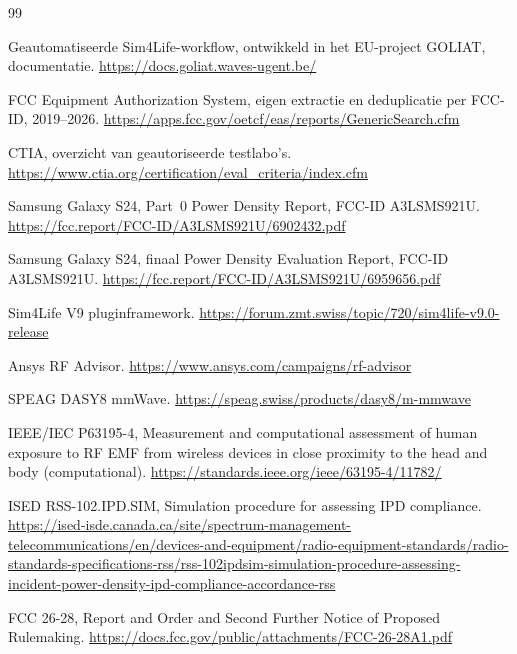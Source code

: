 \documentclass[10pt,a4paper]{article}
\begin{document}
\begingroup
\footnotesize
\begin{thebibliography}{99}

Geautomatiseerde Sim4Life-workflow, ontwikkeld in het EU-project GOLIAT, documentatie.
\url{https://docs.goliat.waves-ugent.be/}

FCC Equipment Authorization System, eigen extractie en deduplicatie per FCC-ID, 2019--2026.
\url{https://apps.fcc.gov/oetcf/eas/reports/GenericSearch.cfm}

CTIA, overzicht van geautoriseerde testlabo's.
\url{https://www.ctia.org/certification/eval_criteria/index.cfm}

Samsung Galaxy S24, Part~0 Power Density Report, FCC-ID A3LSMS921U.
\url{https://fcc.report/FCC-ID/A3LSMS921U/6902432.pdf}

Samsung Galaxy S24, finaal Power Density Evaluation Report, FCC-ID A3LSMS921U.
\url{https://fcc.report/FCC-ID/A3LSMS921U/6959656.pdf}

Sim4Life V9 pluginframework.
\url{https://forum.zmt.swiss/topic/720/sim4life-v9.0-release}

Ansys RF Advisor.
\url{https://www.ansys.com/campaigns/rf-advisor}

SPEAG DASY8 mmWave.
\url{https://speag.swiss/products/dasy8/m-mmwave}

IEEE/IEC P63195-4, Measurement and computational assessment of human exposure to RF EMF from wireless devices in close proximity to the head and body (computational).
\url{https://standards.ieee.org/ieee/63195-4/11782/}

ISED RSS-102.IPD.SIM, Simulation procedure for assessing IPD compliance.
\url{https://ised-isde.canada.ca/site/spectrum-management-telecommunications/en/devices-and-equipment/radio-equipment-standards/radio-standards-specifications-rss/rss-102ipdsim-simulation-procedure-assessing-incident-power-density-ipd-compliance-accordance-rss}

FCC 26-28, Report and Order and Second Further Notice of Proposed Rulemaking.
\url{https://docs.fcc.gov/public/attachments/FCC-26-28A1.pdf}

\end{thebibliography}
\endgroup
\end{document}
